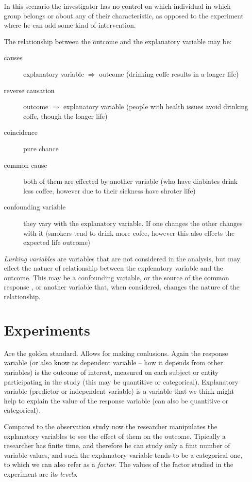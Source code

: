 In this scenario the investigator has no control on which individual in which
group belongs or about any of their characteristic, as opposed to the experiment
where he can add some kind of intervention. 

The relationship between the outcome and the explanatory variable may be:

\begin{description}
  \item[causes] explanatory variable $\Rightarrow$ outcome (drinking coffe
  results in a longer life)
  \item[reverse causation] outcome $\Rightarrow$ explanatory variable (people
  with health issues avoid drinking coffe, though the longer life)
  \item[coincidence] pure chance
  \item[common cause] both of them are effected by another variable (who have
  diabiates drink less coffee, however due to their sickness have shroter life)
  \item[confounding variable] they vary with the explanatory variable. If one
  changes the other changes with it (smokers tend to drink more cofee, however
  this also effects the expected life outcome)
\end{description}

\emph{Lurking variables} are variables that are not considered in the analysis,
but may effect the natuer of relationship between the explenatory variable and
the outcome. This may be a confounding variable, or the source of the common
response , or another variable that, when considered, changes the nature of the
relationship.

\section{Experiments}

Are the golden standard. Allows for making conlusions. Again the response
variable (or also know as dependent variable -- how it depends from other
variables) is the outcome of interest, measured on each subject or entity
participating in the study (this may be quantitive or categorical). Explanatory
variable (predictor or independent variable) is a variable that we think might
help to explain the value of the response variable (can also be quantitive or
categorical).

Compared to the observation study now the researcher manipulates the explanatory
variables to see the effect of them on the outcome. Tipically a researcher has
finite time, and therefore he can study only a finit number of variable values,
and such the explanatory variable tends to be a categorical one, to which we can
also refer as a \emph{factor}. The values of the factor studied in the
experiment are its \emph{levels}.

